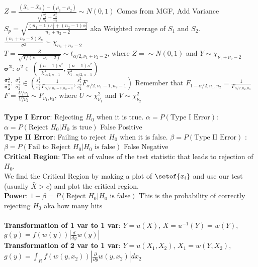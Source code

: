 \documentclass[answers,12pt,addpoints]{exam}
\begin{document}
$Z = \frac{(\bar{X}_1 - \bar{X}_2) - (\mu_1 - \mu_2)}{\sqrt{\frac{\sigma_1^2}{n_1} + \frac{\sigma_2^2}{n_2}}} \sim N(0,1)$  Comes from MGF, Add Variance\\
$S_p = \sqrt{\frac{(n_1-1)s_1^2 + (n_2-1)s_2^2}{n_1+n_2-2}}$ aka Weighted average of $S_1$ and $S_2$. $\frac{(n_1 + n_2 - 2) S_p}{\sigma^2} \sim \chi_{n_1+n_2 -2}$\\
$T = \frac{Z}{\sqrt{Y / (\nu_1 + \nu_2 -2 )}} \sim t_{\alpha/2 , \nu_1 + \nu_2 - 2}$, where $Z =\sim N(0,1)$ and $Y \sim \chi_{\nu_1 + \nu_2 - 2}$\\
$\boldsymbol{\sigma^2}$: $\sigma^2 \in \left(\frac{(n-1)s^2}{\chi_{\alpha/2, n-1}^2}, \frac{(n-1)s^2}{\chi_{1-\alpha/2, n-1}^2}\right)$\\
$\boldsymbol{\frac{\sigma_1^2}{\sigma_2^2}}$: $\frac{\sigma_1^2}{\sigma_2^2} \in \left(\frac{s_1^2}{s_2^2}\frac{1}{F_{\alpha/2, n_1-1, n_2-1}}, \frac{s_1^2}{s_2^2}F_{\alpha/2, n_1-1, n_2-1}\right)$ Remember that $F_{1-\alpha/2, n_1, n_2} = \frac{1}{F_{\alpha/2, n_2, n_1}}$\\
$F = \frac{U / \nu_1}{V / \nu_2} \sim F_{\nu_1, \nu_2}$, where $U \sim \chi_{\nu_1}^2$ and $V \sim \chi_{\nu_2}^2$ \\\\
\textbf{Type I Error}: Rejecting $H_0$ when it is true. $\alpha = P(\text{Type I Error})$: $\alpha = P(\text{Reject } H_0 | H_0 \text{ is true})$ False Positive\\
\textbf{Type II Error}: Failing to reject $H_0$ when it is false. $\beta = P(\text{Type II Error})$ : $\beta = P(\text{Fail to Reject } H_0 | H_0 \text{ is false})$ False Negative\\
\textbf{Critical Region}: The set of values of the test statistic that leads to rejection of $H_0$. \\
We find the Critical Region by making a plot of $\setof{x_i}$ and use our test (usually $\bar{X} > c$) and plot the critical region.\\
\textbf{Power}: $1-\beta = P(\text{Reject } H_0 | H_0 \text{ is false})$ This is the probability of correctly rejecting $H_0$ aka how many hits\\\\
\textbf{Transformation of 1 var to 1 var}: $Y = u(X)$, $X = u^{-1}(Y) = w(Y)$, $g(y) =  f(w(y))|\frac{d}{dy}w(y)| $\\
\textbf{Transformation of 2 var to 1 var}: $Y = u(X_1, X_2)$, $X_1 = w(Y, X_2)$, $g(y) = \int_R f(w(y, x_2))|\frac{\partial}{\partial y}w(y, x_2)|dx_2$\\\
\end{document}
